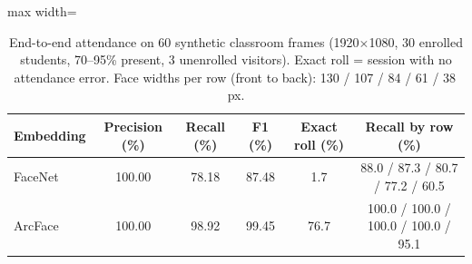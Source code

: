 \begin{table}[H]
\caption{End-to-end attendance on 60 synthetic classroom frames (1920$\times$1080, 30 enrolled students, 70--95\% present, 3 unenrolled visitors). Exact roll = session with no attendance error. Face widths per row (front to back): 130 / 107 / 84 / 61 / 38\,px.}
\centering
\label{tab:att_sim}
\begin{adjustbox}{max width=\textwidth}
\begin{tabular}{lccccc}
\toprule
\bf Embedding & \bf Precision (\%) & \bf Recall (\%) & \bf F1 (\%) & \bf Exact roll (\%) & \bf Recall by row (\%) \\
\midrule
FaceNet & 100.00 & 78.18 & 87.48 & 1.7 & 88.0 / 87.3 / 80.7 / 77.2 / 60.5 \\
ArcFace & 100.00 & 98.92 & 99.45 & 76.7 & 100.0 / 100.0 / 100.0 / 100.0 / 95.1 \\
\bottomrule
\end{tabular}
\end{adjustbox}
\end{table}
